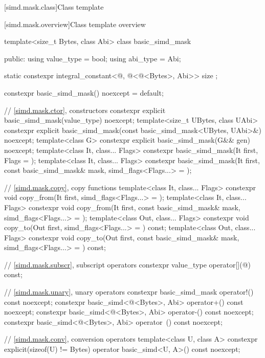 [simd.mask.class]{Class template }

[simd.mask.overview]{Class template  overview}

\begin{codeblock}
template<size_t Bytes, class Abi> class basic_simd_mask {
public:
  using value_type = bool;
  using abi_type = Abi;

  static constexpr integral_constant<@\simdsizetype@, @\simdsizev@<@\integerfrom@<Bytes>, Abi>>
    size {};

  constexpr basic_simd_mask() noexcept = default;

  // \ref{simd.mask.ctor},  constructors
  constexpr explicit basic_simd_mask(value_type) noexcept;
  template<size_t UBytes, class UAbi>
    constexpr explicit basic_simd_mask(const basic_simd_mask<UBytes, UAbi>&) noexcept;
  template<class G> constexpr explicit basic_simd_mask(G&& gen) noexcept;
  template<class It, class... Flags>
    constexpr basic_simd_mask(It first, Flags = {});
  template<class It, class... Flags>
    constexpr basic_simd_mask(It first, const basic_simd_mask& mask, simd_flags<Flags...> = {});

  // \ref{simd.mask.copy},  copy functions
  template<class It, class... Flags>
    constexpr void copy_from(It first, simd_flags<Flags...> = {});
  template<class It, class... Flags>
    constexpr void copy_from(It first, const basic_simd_mask& mask, simd_flags<Flags...> = {});
  template<class Out, class... Flags>
    constexpr void copy_to(Out first, simd_flags<Flags...> = {}) const;
  template<class Out, class... Flags>
    constexpr void copy_to(Out first, const basic_simd_mask& mask,
                           simd_flags<Flags...> = {}) const;

  // \ref{simd.mask.subscr},  subscript operators
  constexpr value_type operator[](@\simdsizetype@) const;

  // \ref{simd.mask.unary},  unary operators
  constexpr basic_simd_mask operator!() const noexcept;
  constexpr basic_simd<@\integerfrom@<Bytes>, Abi> operator+() const noexcept;
  constexpr basic_simd<@\integerfrom@<Bytes>, Abi> operator-() const noexcept;
  constexpr basic_simd<@\integerfrom@<Bytes>, Abi> operator~() const noexcept;

  // \ref{simd.mask.conv},  conversion operators
  template<class U, class A>
    constexpr explicit(sizeof(U) != Bytes) operator basic_simd<U, A>() const noexcept;

}
\end{codeblock}
